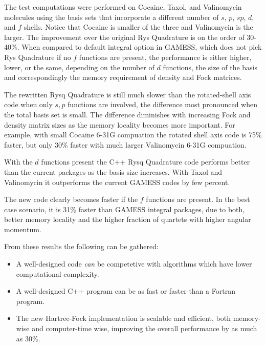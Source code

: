 \documentclass[12pt]{article}
\begin{document}
The test computations were performed on Cocaine, Taxol, and
Valinomycin molecules using the basis sets that incorporate a
different number of $s$, $p$, $sp$, $d$, and $f$ shells.  Notice that
Cocaine is smaller of the three and Valinomycin is the larger.  The
improvement over the original Rys Quadrature is on the order of
30-40\%.  When compared to default integral option in GAMESS, which
does not pick Rys Quadrature if no $f$ functions are present, the
performance is either higher, lower, or the same, depending on the
number of $d$ functions, the size of the basis and correspondingly the
memory requirement of density and Fock matrices.

The rewritten Rysq Quadrature is still much slower than the
rotated-shell axis code when only $s, p$ functions are involved, the
difference most pronounced when the total basis set is small.  The
difference diminishes with increasing Fock and density matrix sizes as
the memory locality becomes more important.  For example, with small
Cocaine 6-31G compuation the rotated shell axis code is 75\%
faster, but only 30\% faster with much larger Valinomycin 6-31G
compuation.

With the $d$ functions present the C++ Rysq Quadrature code performs
 better than the current packages as the basis size
increases.  With Taxol and Valinomycin it outperforms the current
GAMESS codes by few percent.

The new code clearly becomes faster if the $f$ functions are present.
In the best case scenario, it is 31\% faster than GAMESS integral
packages, due to both, better memory locality and the higher fraction
of quartets with higher angular momentum.

From these results the following can be gathered:
\begin{itemize}
  \item A well-designed code {\it can} be competetive with
    algorithms which have lower computational complexity.
  \item A well-designed C++ program can be as fast or faster than a
    Fortran program.
  \item The new Hartree-Fock implementation is scalable and efficient,
    both memory-wise and computer-time wise, improving the overall
    performance by as much as 30\%.
\end{itemize}
\end{document}
